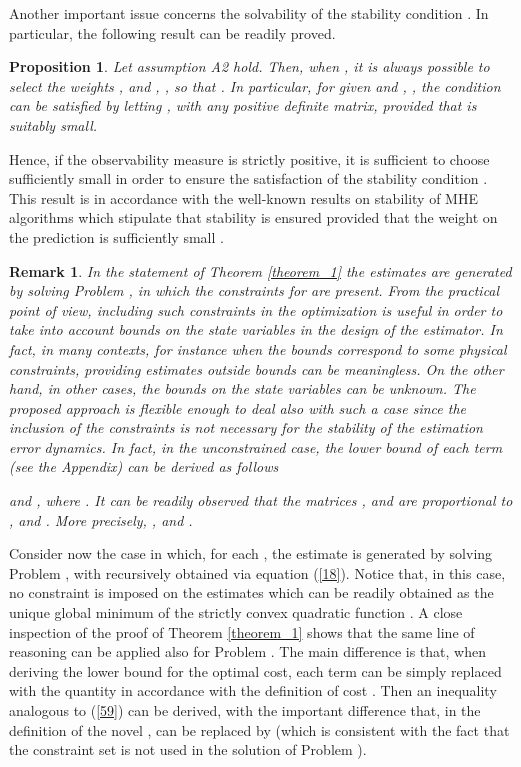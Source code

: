 \documentclass[11pt,journal,onecolumn]{IEEEtran}
\newtheorem{proposition}{Proposition}
\newtheorem{remark}{Remark}
\begin{document}
Another important issue concerns the solvability of the stability condition . In particular, the following result can be readily proved.
 \vspace{.3cm}
\begin{proposition}\label{proposition2}
Let assumption A2 hold. Then, when ,  it is always possible to select the weights ,  and , , so that . In particular, for given  and , , the condition  can be satisfied by letting , with  any positive definite matrix, provided that  is suitably small.
\end{proposition}
\vspace{.3cm}

Hence, if the observability measure  is strictly positive, it is sufficient to choose  sufficiently small in order to ensure the satisfaction of the stability condition .  This result is in accordance with the well-known results on stability of MHE algorithms which stipulate that stability is ensured provided that the weight on the prediction is sufficiently small \cite{NLMHE}.

\begin{remark}
In the statement of Theorem \ref{theorem_1} the estimates  are generated by solving Problem , in which the constraints  for  are present. From the practical point of view, including such constraints in the optimization is useful in order to take into account bounds on the state variables in the design of the estimator. In fact,
in many contexts, for instance when the bounds correspond to some physical constraints, providing estimates outside bounds can be meaningless.
On the other hand, in other cases, the bounds on the state variables can be unknown. The proposed approach is flexible enough to deal also with such a case since the inclusion of the constraints is not necessary for the stability of the estimation error dynamics. In fact, in the unconstrained case,
the lower bound of each term  (see the Appendix) can be derived as follows

and , where
.
It can be readily observed that the matrices ,  and  are proportional to ,  and .
More precisely, ,  and .
\end{remark}

Consider now the case in which, for each , the estimate  is generated by solving Problem , with  recursively obtained via equation (\ref{18}). Notice that, in this case, no constraint is imposed on the estimates  which can be readily obtained as the unique global minimum of the strictly convex quadratic function . A close inspection of the proof of Theorem \ref{theorem_1} shows that the same line of reasoning can be applied also for Problem . The main difference is that, when deriving the lower bound for the optimal cost, each term  can be simply replaced with the quantity  in accordance with the definition of cost . Then an inequality analogous to (\ref{59}) can be derived, with the important difference that, in the definition of the novel ,  can be replaced by   (which is consistent with the fact that the constraint set  is not used in the solution of Problem ).
\end{document}
